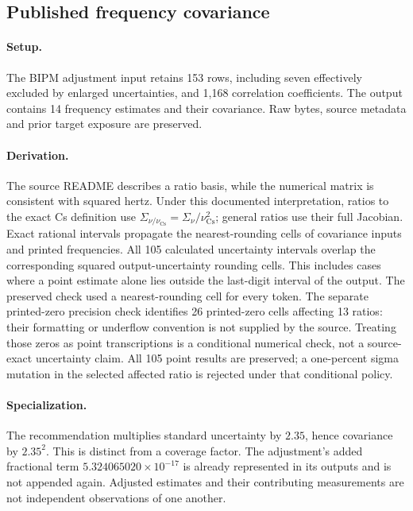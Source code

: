 
\subsection{Published frequency covariance}
\paragraph{Setup.}
The BIPM adjustment input retains 153 rows, including seven effectively excluded by enlarged uncertainties, and 1,168 correlation coefficients. The output contains 14 frequency estimates and their covariance. Raw bytes, source metadata and prior target exposure are preserved.

\paragraph{Derivation.}
The source README describes a ratio basis, while the numerical matrix is consistent with squared hertz. Under this documented interpretation, ratios to the exact Cs definition use \(\Sigma_{\nu/\nu_{\mathrm{Cs}}}=\Sigma_\nu/\nu_{\mathrm{Cs}}^2\); general ratios use their full Jacobian. Exact rational intervals propagate the nearest-rounding cells of covariance inputs and printed frequencies. All 105 calculated uncertainty intervals overlap the corresponding squared output-uncertainty rounding cells. This includes cases where a point estimate alone lies outside the last-digit interval of the output. The preserved check used a nearest-rounding cell for every token. The separate printed-zero precision check identifies 26 printed-zero cells affecting 13 ratios: their formatting or underflow convention is not supplied by the source. Treating those zeros as point transcriptions is a conditional numerical check, not a source-exact uncertainty claim. All 105 point results are preserved; a one-percent sigma mutation in the selected affected ratio is rejected under that conditional policy.

\paragraph{Specialization.}
The recommendation multiplies standard uncertainty by \(2.35\), hence covariance by \(2.35^2\). This is distinct from a coverage factor. The adjustment's added fractional term \(5.324065020\times10^{-17}\) is already represented in its outputs and is not appended again. Adjusted estimates and their contributing measurements are not independent observations of one another.

